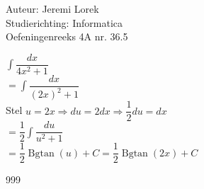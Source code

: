 \documentclass[a4paper]{article}
\begin{document}
\noindent \large Auteur: Jeremi Lorek\\
\noindent \large Studierichting: Informatica\\
\noindent \large Oefeningenreeks 4A nr. 36.5\\

\medskip
\normalsize

$\displaystyle \int \dfrac{dx}{4x^2 + 1}$ \\

$= \displaystyle \int \dfrac{dx}{(2x)^2 + 1}$ \\

Stel $u = 2x \Rightarrow du = 2 dx \Rightarrow \dfrac{1}{2} du = dx $\\

$= \dfrac{1}{2} \displaystyle \int \dfrac{du}{u^2 + 1}$ \\

$= \dfrac{1}{2} \operatorname{Bgtan}(u) + C = \dfrac{1}{2} \operatorname{Bgtan}(2x) + C$ \\

\begin{thebibliography}{999}
\end{thebibliography}
\end{document}
